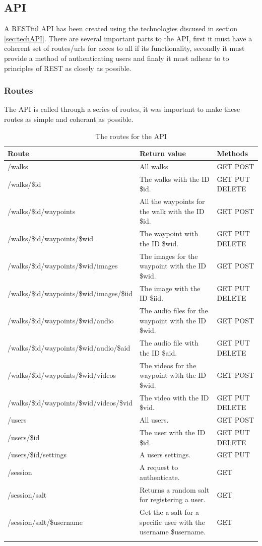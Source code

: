 \documentclass[11pt,a4paper]{article}
\begin{document}
\subsection{API}

A RESTful API has been created using the technologies discused in section \ref{sec:techAPI}. There are several important parts to the API, first it must have a coherent set of routes/urls for acces to all if its functionality, secondly it must provide a method of authenticating users and finaly it must adhear to to principles of REST as closely as possible. 

\subsubsection{Routes}

The API is called through a series of routes, it was important to make these routes as simple and coherant as possible.

\begin{longtable}{m{}|m{}|C{0.11\textwidth}}
    \textbf{Route} & \textbf{Return value} & \textbf{Methods} \\\hline
    /walks & All walks & GET POST\\ \hline
    /walks/\$id & The walks with the ID \$id. & GET PUT DELETE\\ \hline
    /walks/\$id/waypoints & All the waypoints for the walk with the ID \$id. & GET POST\\ \hline
    /walks/\$id/waypoints/\$wid & The waypoint with the ID \$wid. & GET PUT DELETE \\ \hline
    /walks/\$id/waypoints/\$wid/images & The images for the waypoint with the ID \$wid. & GET POST \\ \hline
    /walks/\$id/waypoints/\$wid/images/\$iid & The image with the ID \$iid. & GET PUT DELETE \\ \hline
    /walks/\$id/waypoints/\$wid/audio & The audio files for the waypoint with the ID \$wid. & GET POST \\ \hline
    /walks/\$id/waypoints/\$wid/audio/\$aid & The audio file with the ID \$aid. & GET PUT DELETE \\ \hline
    /walks/\$id/waypoints/\$wid/videos & The videos for the waypoint with the ID \$wid. & GET POST \\ \hline
    /walks/\$id/waypoints/\$wid/videos/\$vid & The video with the ID \$vid. & GET PUT DELETE \\ \hline
    /users & All users. & GET POST \\\hline
    /users/\$id & The user with the ID \$id. & GET PUT DELETE \\\hline
    /users/\$id/settings & A users settings. & GET PUT \\\hline
    /session & A request to authenticate. & GET\\\hline
    /session/salt & Returns a random salt for registering a user. & GET\\\hline
    /session/salt/\$username & Get the a salt for a specific user with the username \$username. & GET\\
    \caption {The routes for the API}
    \label{routes}
\end{longtable}
\end{document}
